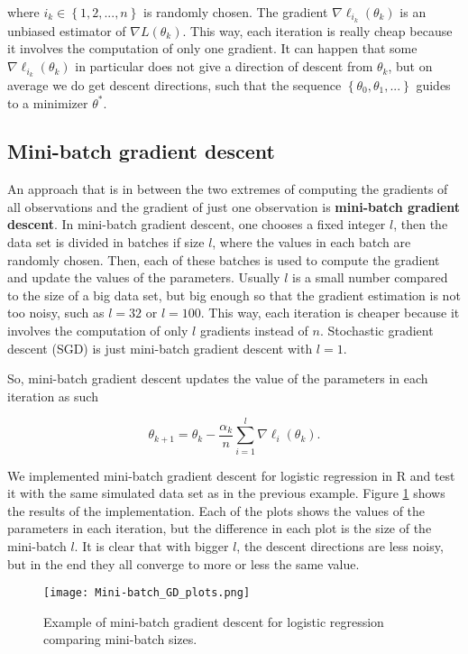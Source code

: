 where $i_k \in \left\{1, 2, ..., n \right\}$ is randomly chosen. The gradient $\nabla \ell_{i_k}(\theta_k)$ is an unbiased estimator of $\nabla L(\theta_k)$. This way, each iteration is really cheap because it involves the computation of only one gradient. It can happen that some $\nabla \ell_{i_k}(\theta_k)$ in particular does not give a direction of descent from $\theta_k$, but on average we do get descent directions, such that the sequence $\left\{ \theta_0, \theta_1, ... \right\}$ guides to a minimizer $\theta^*$.

\subsection{Mini-batch gradient descent}

An approach that is in between the two extremes of computing the gradients of all observations and the gradient of just one observation is \textbf{mini-batch gradient descent}. In mini-batch gradient descent, one chooses a fixed integer $l$, then the data set is divided in batches if size $l$, where the values in each batch are randomly chosen. Then, each of these batches is used to compute the gradient and update the values of the parameters. Usually $l$ is a small number compared to the size of a big data set, but big enough so that the gradient estimation is not too noisy, such as $l = 32$ or $l = 100$. This way, each iteration is cheaper because it involves the computation of only $l$ gradients instead of $n$. Stochastic gradient descent (SGD) is just mini-batch gradient descent with $l = 1$.

So, mini-batch gradient descent updates the value of the parameters in each iteration as such


$$
  \theta_{k+1} = \theta_k - \frac{\alpha_k}{n} \sum_{i = 1}^l \nabla \ell_i(\theta_k).
$$


We implemented mini-batch gradient descent for logistic regression in R and test it with the same simulated data set as in the previous example. Figure \ref{fig:Mini-batch_GD_plots} shows the results of the implementation. Each of the plots shows the values of the parameters in each iteration, but the difference in each plot is the size of the mini-batch $l$. It is clear that with bigger $l$, the descent directions are less noisy, but in the end they all converge to more or less the same value.

\begin{figure}[H]
    \centering
    \texttt{[image: Mini-batch\_GD\_plots.png]}
    \caption{Example of mini-batch gradient descent for logistic regression comparing mini-batch sizes.}
    \label{fig:Mini-batch_GD_plots}
\end{figure}


